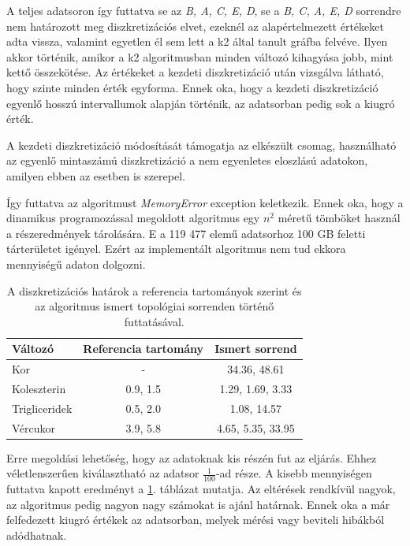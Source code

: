 A teljes adatsoron így futtatva se az \emph{B, A, C, E, D}, se a \emph{B, C, A, E, D} sorrendre nem határozott meg diszkretizációs elvet, ezeknél az alapértelmezett értékeket adta vissza, valamint egyetlen él sem lett a k2 által tanult gráfba felvéve. Ilyen akkor történik, amikor a k2 algoritmusban minden változó kihagyása jobb, mint kettő összekötése. Az értékeket a kezdeti diszkretizáció után vizsgálva látható, hogy szinte minden érték egyforma. Ennek oka, hogy a kezdeti diszkretizáció egyenlő hosszú intervallumok alapján történik, az adatsorban pedig sok a kiugró érték.

A kezdeti diszkretizáció módosítását támogatja az elkészült csomag, használható az egyenlő mintaszámú diszkretizáció a nem egyenletes eloszlású adatokon, amilyen ebben az esetben is szerepel.

Így futtatva az algoritmust \emph{MemoryError} exception keletkezik. Ennek oka, hogy a dinamikus programozással megoldott algoritmus egy $n^{2}$ méretű tömböket használ a részeredmények tárolására. E a 119 477 elemű adatsorhoz 100 GB feletti tárterületet igényel. Ezért az implementált algoritmus nem tud ekkora mennyiségű adaton dolgozni.

\begin{table}[htp]\centering
    \begin{tabular}{lcc}
    Változó       & Referencia tartomány & Ismert sorrend    \\ \hline
    Kor           & -                    & 34.36, 48.61      \\
    Koleszterin   & 0.9, 1.5             & 1.29, 1.69, 3.33  \\
    Trigliceridek & 0.5, 2.0             & 1.08, 14.57       \\
    Vércukor      & 3.9, 5.8             & 4.65, 5.35, 33.95
    \end{tabular}
    \caption{A diszkretizációs határok a referencia tartományok szerint és az algoritmus ismert topológiai sorrenden történő futtatásával.}
    \label{tab:cardio_kisebb_adat}
\end{table}

Erre megoldási lehetőség, hogy az adatoknak kis részén fut az eljárás. Ehhez véletlenszerűen kiválasztható az adatsor $\frac{1}{100}$-ad része. A kisebb mennyiségen futtatva kapott eredményt a \ref{tab:cardio_kisebb_adat}. táblázat mutatja. Az eltérések rendkívül nagyok, az algoritmus pedig nagyon nagy számokat is ajánl határnak. Ennek oka a már felfedezett kiugró értékek az adatsorban, melyek mérési vagy beviteli hibákból adódhatnak.

